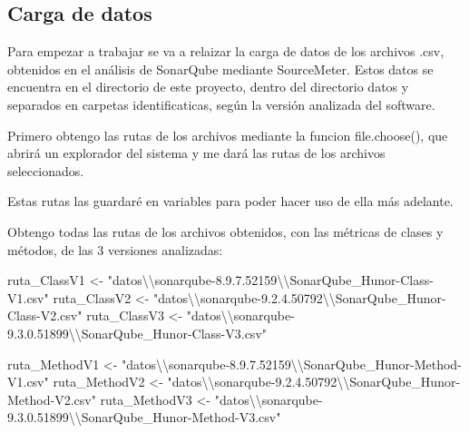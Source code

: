 \documentclass[
]{article}
\newenvironment{Shaded}{\begin{snugshade}}{\end{snugshade}}
\newcommand{\NormalTok}[1]{#1}
\newcommand{\OtherTok}[1]{\textcolor[rgb]{0.56,0.35,0.01}{#1}}
\newcommand{\SpecialCharTok}[1]{\textcolor[rgb]{0.00,0.00,0.00}{#1}}
\newcommand{\StringTok}[1]{\textcolor[rgb]{0.31,0.60,0.02}{#1}}
\begin{document}
\hypertarget{carga-de-datos}{%
\subsection{Carga de datos}\label{carga-de-datos}}

Para empezar a trabajar se va a relaizar la carga de datos de los
archivos .csv, obtenidos en el análisis de SonarQube mediante
SourceMeter. Estos datos se encuentra en el directorio de este proyecto,
dentro del directorio datos y separados en carpetas identificaticas,
según la versión analizada del software.

Primero obtengo las rutas de los archivos mediante la funcion
file.choose(), que abrirá un explorador del sistema y me dará las rutas
de los archivos seleccionados.

Estas rutas las guardaré en variables para poder hacer uso de ella más
adelante.

Obtengo todas las rutas de los archivos obtenidos, con las métricas de
clases y métodos, de las 3 versiones analizadas:

\begin{Shaded}
\begin{Highlighting}[]
\NormalTok{ruta\_ClassV1 }\OtherTok{\textless{}{-}} \StringTok{"datos}\SpecialCharTok{\textbackslash{}\textbackslash{}}\StringTok{sonarqube{-}8.9.7.52159}\SpecialCharTok{\textbackslash{}\textbackslash{}}\StringTok{SonarQube\_Hunor{-}Class{-}V1.csv"}
\NormalTok{ruta\_ClassV2 }\OtherTok{\textless{}{-}} \StringTok{"datos}\SpecialCharTok{\textbackslash{}\textbackslash{}}\StringTok{sonarqube{-}9.2.4.50792}\SpecialCharTok{\textbackslash{}\textbackslash{}}\StringTok{SonarQube\_Hunor{-}Class{-}V2.csv"}
\NormalTok{ruta\_ClassV3 }\OtherTok{\textless{}{-}} \StringTok{"datos}\SpecialCharTok{\textbackslash{}\textbackslash{}}\StringTok{sonarqube{-}9.3.0.51899}\SpecialCharTok{\textbackslash{}\textbackslash{}}\StringTok{SonarQube\_Hunor{-}Class{-}V3.csv"}

\NormalTok{ruta\_MethodV1 }\OtherTok{\textless{}{-}} \StringTok{"datos}\SpecialCharTok{\textbackslash{}\textbackslash{}}\StringTok{sonarqube{-}8.9.7.52159}\SpecialCharTok{\textbackslash{}\textbackslash{}}\StringTok{SonarQube\_Hunor{-}Method{-}V1.csv"}
\NormalTok{ruta\_MethodV2 }\OtherTok{\textless{}{-}} \StringTok{"datos}\SpecialCharTok{\textbackslash{}\textbackslash{}}\StringTok{sonarqube{-}9.2.4.50792}\SpecialCharTok{\textbackslash{}\textbackslash{}}\StringTok{SonarQube\_Hunor{-}Method{-}V2.csv"}
\NormalTok{ruta\_MethodV3 }\OtherTok{\textless{}{-}} \StringTok{"datos}\SpecialCharTok{\textbackslash{}\textbackslash{}}\StringTok{sonarqube{-}9.3.0.51899}\SpecialCharTok{\textbackslash{}\textbackslash{}}\StringTok{SonarQube\_Hunor{-}Method{-}V3.csv"}
\end{Highlighting}
\end{Shaded}
\end{document}
